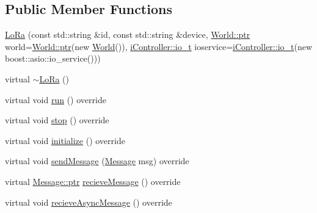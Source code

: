 \subsection*{Public Member Functions}
\begin{DoxyCompactItemize}
\item 
\hyperlink{classo_cpt_1_1_lo_ra_ad793d1628f429e79babc356d2f64a6c9}{Lo\+Ra} (const std\+::string \&id, const std\+::string \&device, \hyperlink{classo_cpt_1_1_world_aa6e591e3096d5de71e0cec9039663d67}{World\+::ptr} world=\hyperlink{classo_cpt_1_1_world_aa6e591e3096d5de71e0cec9039663d67}{World\+::ptr}(new \hyperlink{classo_cpt_1_1_world}{World}()), \hyperlink{classo_cpt_1_1i_controller_a51c3436b03060209f6cd2ddce6df2d0c}{i\+Controller\+::io\+\_\+t} ioservice=\hyperlink{classo_cpt_1_1i_controller_a51c3436b03060209f6cd2ddce6df2d0c}{i\+Controller\+::io\+\_\+t}(new boost\+::asio\+::io\+\_\+service()))
\item 
virtual \hyperlink{classo_cpt_1_1_lo_ra_a203df2d51c12d24731241f89bec20200}{$\sim$\+Lo\+Ra} ()
\item 
virtual void \hyperlink{classo_cpt_1_1_lo_ra_aacbca715826b810736e9bf5c3a9ce338}{run} () override
\item 
virtual void \hyperlink{classo_cpt_1_1_lo_ra_a8300de2590a7ce8b56863eb4059f14ad}{stop} () override
\item 
virtual void \hyperlink{classo_cpt_1_1_lo_ra_aa0646143f843d43fcd680344dfcb2a14}{initialize} () override
\item 
virtual void \hyperlink{classo_cpt_1_1_lo_ra_a053e29e992490cffb90741c009664272}{send\+Message} (\hyperlink{structo_cpt_1_1i_comm_1_1_message}{Message} msg) override
\item 
virtual \hyperlink{structo_cpt_1_1i_comm_1_1_message_ad2ba828ad76f96a30e3898b2609a4c01}{Message\+::ptr} \hyperlink{classo_cpt_1_1_lo_ra_a191e265a569a80c53e6829d57d402969}{recieve\+Message} () override
\item 
virtual void \hyperlink{classo_cpt_1_1_lo_ra_a6d4aa003a6ad9277998f34ee858b6264}{recieve\+Async\+Message} () override
\end{DoxyCompactItemize}
